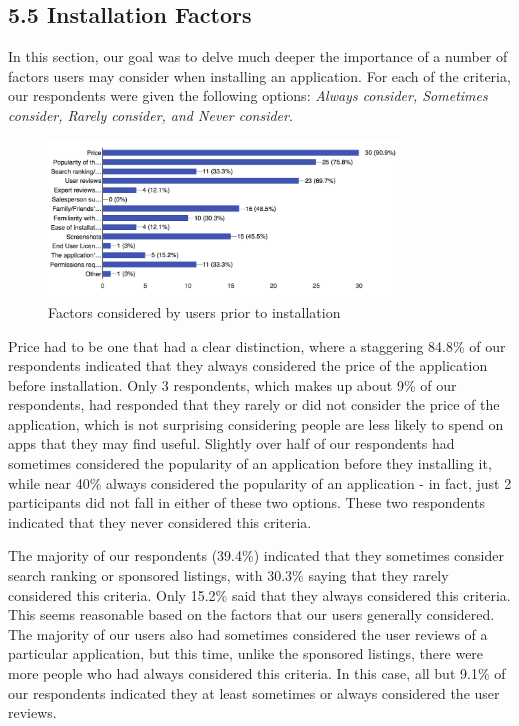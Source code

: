 \documentclass{sigchi}
\begin{document}
\subsection{5.5 Installation Factors}

In this section, our goal was to delve much deeper the importance of a number of factors users may consider when installing an application. For each of the criteria, our respondents were given the following options: \textit{ Always consider, Sometimes consider, Rarely consider, and Never consider}.

\begin{figure}[h]
    \includegraphics[height=4.2cm]{factors}
    \caption{Factors considered by users prior to installation}
    \label{fig:installFactors}
\end{figure}

Price had to be one that had a clear distinction, where a staggering 84.8\% of our respondents indicated that they always considered the price of the application before installation. Only 3 respondents, which makes up about 9\% of our respondents, had responded that they rarely or did not consider the price of the application, which is not surprising considering people are less likely to spend on apps that they may find  useful. Slightly over half of our respondents had sometimes considered the popularity of an application before they installing it, while near 40\% always considered the popularity of an application - in fact, just 2 participants did not fall in either of these two options. These two respondents indicated that they never considered this criteria. 

The majority of our respondents (39.4\%) indicated that they sometimes consider search ranking or sponsored listings, with 30.3\% saying that they rarely considered this criteria. Only 15.2\% said that they always considered this criteria. This seems reasonable based on the factors that our users generally considered. The majority of our users also had sometimes considered the user reviews of a particular application, but this time, unlike the sponsored listings, there were more people who had always considered this criteria. In this case, all but 9.1\% of our respondents indicated they at least sometimes or always considered the user reviews.
\end{document}
